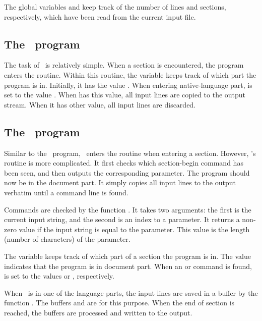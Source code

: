 The global variables  and  keep
track of the number of lines and sections, respectively, which have
been read from the current input file.

\subsection{The \tangle\ program}

The task of \tangle\ is relatively simple. When a section is
encountered, the program enters the  routine. Within
this routine, the variable  keeps track of which part
the program is in. Initially, it has the value . When
entering native-language part,  
is set to the value . When  has this value,
all input lines are copied to the output stream. When it has other
value, all input lines are discarded.

\subsection{The \weave\ program}

Similar to the \tangle\ program, \weave\ enters the routine
 when entering a section. However, \weave's
 routine is more complicated. It first checks
which section-begin command has been seen, and then outputs the
corresponding parameter. The program should now be in the document
part. It simply copies all input lines to the output verbatim until a
command line is found. 

Commands are checked by the function . It takes two
arguments: the first is the current input string, and the second is an
index to a parameter. It returns a non-zero value if the input string
is equal to the parameter. This value is the length (number of
characters) of the parameter.

The variable  keeps track of which part of a section
the program is in. The value  indicates that the
program is in document part. When an  or
 command is found,  is set to the
values  or , respectively. 

When \weave\ is in one of the language parts, the input lines are saved
in a buffer by the function . The buffers
 and  are for this purpose. When the
end of section is reached, the buffers are processed and written to
the output. 

